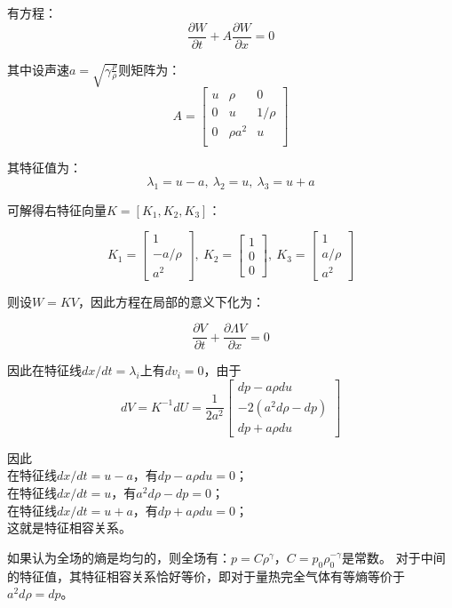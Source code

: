 \documentclass[UTF8,zihao=5]{ctexart} %
\newcommand*{\pd}[2]{\frac{\partial #1}{\partial #2}}
\begin{document}
有方程：
$$
    \pd{W}{t}+A\pd{W}{x}=0
$$

其中设声速$a=\sqrt{\gamma \frac{p}{\rho}}$则矩阵为：
\begin{equation}
    A=\begin{bmatrix}
        u & \rho     & 0      \\
        0 & u        & 1/\rho \\
        0 & \rho a^2 & u      \\
    \end{bmatrix}
\end{equation}

其特征值为：
$$
\lambda_1=u-a,\ \lambda_2=u,\ \lambda_3=u+a
$$

可解得右特征向量$K=[K_1,K_2,K_3]$：


$$
K_1=\begin{bmatrix}
    1\\-a/\rho\\a^2
\end{bmatrix},\ 
K_2=\begin{bmatrix}
    1\\0\\0
\end{bmatrix},\ 
K_3=\begin{bmatrix}
    1\\a/\rho\\a^2
\end{bmatrix}
$$

则设$W=KV$，因此方程在局部的意义下化为：


\begin{equation}
    \pd{V}{t}+\pd{\Lambda V}{x}=0
\end{equation}

因此在特征线$dx/dt=\lambda_i$上有$dv_i=0$，由于
$$
dV=K^{-1}dU=\frac{1}{2a^2}\begin{bmatrix}
    dp-a\rho du\\
    -2(a^2d\rho-dp)\\
    dp+a\rho du
\end{bmatrix}
$$

因此\\
在特征线$dx/dt=u-a$，有$dp-a\rho du=0$；\\
在特征线$dx/dt=u$，有$a^2d\rho-dp=0$；\\
在特征线$dx/dt=u+a$，有$dp+a\rho du=0$；\\

这就是特征相容关系。

如果认为全场的熵是均匀的，则全场有：$p=C\rho^\gamma$，$C=p_0\rho_0^{-\gamma}$是常数。
对于中间的特征值，其特征相容关系恰好等价，即对于量热完全气体有等熵等价于
$a^2d\rho=dp$。
\end{document}
